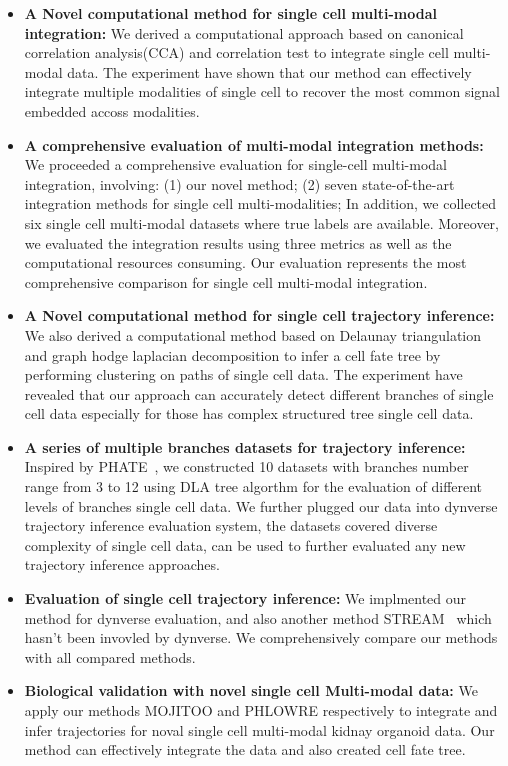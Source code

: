 \begin{itemize}
	\item \textbf{A Novel computational method for single cell multi-modal integration:} We derived a computational approach based on canonical correlation analysis(CCA) and correlation test to integrate single cell multi-modal data. The experiment have shown that our method can effectively integrate multiple modalities of single cell to recover the most common signal embedded accoss modalities.

	\item \textbf{A comprehensive evaluation of multi-modal integration methods:} We proceeded a comprehensive evaluation for single-cell multi-modal integration, involving: (1) our novel method; (2) seven state-of-the-art integration methods for single cell multi-modalities; In addition, we collected six single cell multi-modal datasets where true labels are available. Moreover, we evaluated the integration results using three metrics as well as the computational resources consuming. Our evaluation represents the most comprehensive comparison for single cell multi-modal integration.

	\item \textbf{A Novel computational method for single cell trajectory inference:} We also derived a computational method based on Delaunay triangulation and graph hodge laplacian decomposition to infer a cell fate tree by performing clustering on paths of single cell data. The experiment have revealed that our approach can accurately detect different branches of single cell data especially for those has complex structured tree single cell data.

	\item \textbf{A series of multiple branches datasets for trajectory inference:} Inspired by PHATE~\citep{moon2017phate}, we constructed 10 datasets with branches number range from 3 to 12 using DLA tree algorthm for the evaluation of different levels of branches single cell data. We further plugged our data into dynverse trajectory inference evaluation system, the datasets covered diverse complexity of single cell data, can be used to further evaluated any new trajectory inference approaches.

	\item \textbf{Evaluation of single cell trajectory inference:} We implmented our method for dynverse evaluation, and also another method STREAM~\citep{chen2019stream} which hasn't been invovled by dynverse. We comprehensively compare our methods with all compared methods.

	\item \textbf{Biological validation with novel single cell Multi-modal data:} We apply our methods MOJITOO and PHLOWRE respectively to integrate and infer trajectories for noval single cell multi-modal kidnay organoid data. Our method can effectively integrate the data and also created cell fate tree.
\end{itemize}

